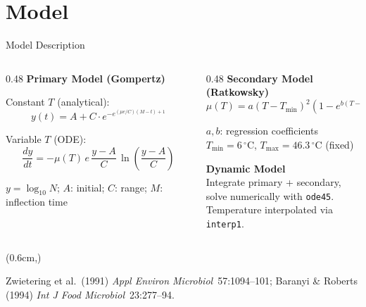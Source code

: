 \documentclass[10pt,aspectratio=169]{beamer}
\newcommand{\citefoot}[1]{%
  \begin{textblock*}{\dimexpr\paperwidth-1.2cm}(0.6cm,\dimexpr\paperheight-0.65cm)
  {\tiny\color{gray}\raggedright #1}
  \end{textblock*}
}
\begin{document}
\section{Model}
\begin{frame}{Model Description}
\begin{columns}[T]
\begin{column}{0.48\textwidth}
\textbf{Primary Model (Gompertz)}

Constant $T$ (analytical):
\begin{equation*}
y(t) = A + C \cdot e^{-e^{(\mu e / C)(M-t)+1}}
\end{equation*}

Variable $T$ (ODE):
\begin{equation*}
\frac{dy}{dt} = -\mu(T)\, e\, \frac{y-A}{C}\, \ln\!\left(\frac{y-A}{C}\right)
\end{equation*}

$y = \log_{10}N$;\; $A$: initial;\; $C$: range;\; $M$: inflection time
\end{column}
\begin{column}{0.48\textwidth}
\textbf{Secondary Model (Ratkowsky)}
\begin{equation*}
\mu(T) = a(T - T_{\min})^2 \left(1 - e^{b(T - T_{\max})}\right)
\end{equation*}

$a, b$: regression coefficients\\
$T_{\min} = 6\,^\circ$C,\; $T_{\max} = 46.3\,^\circ$C (fixed)

\vspace{1em}
\textbf{Dynamic Model}\\
Integrate primary + secondary,\\
solve numerically with \texttt{ode45}.\\
Temperature interpolated via \texttt{interp1}.
\end{column}
\end{columns}
\citefoot{Zwietering et al.\ (1991) \textit{Appl Environ Microbiol}\ 57:1094--101; Baranyi \& Roberts (1994) \textit{Int J Food Microbiol}\ 23:277--94.}
\end{frame}

\end{document}
